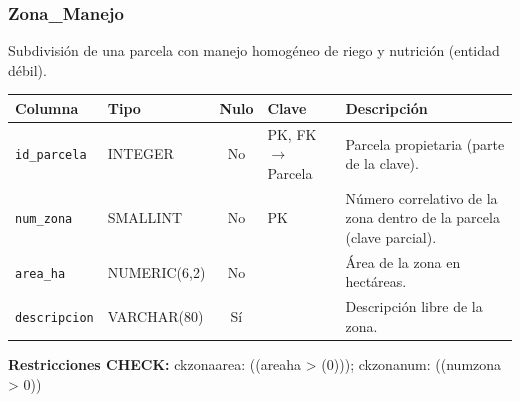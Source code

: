 \documentclass[11pt,letterpaper]{article}
\newcommand{\tbus}{\textunderscore\allowbreak}
\newcommand{\tb}[1]{{\ttfamily\let\_\tbus #1}}
\begin{document}
\subsubsection*{Zona\_Manejo}
Subdivisión de una parcela con manejo homogéneo de riego y nutrición (entidad débil).
{\footnotesize
\begin{longtable}{>{\raggedright\arraybackslash}p{3.3cm}>{\raggedright\arraybackslash}p{2.5cm}c>{\raggedright\arraybackslash}p{2.2cm}>{\raggedright\arraybackslash}p{6.1cm}}
\toprule
\textbf{Columna} & \textbf{Tipo} & \textbf{Nulo} & \textbf{Clave} & \textbf{Descripción} \\
\midrule
\endhead
\texttt{id\_parcela} & INTEGER & No & PK, FK $\to$ Parcela & Parcela propietaria (parte de la clave). \\
\texttt{num\_zona} & SMALLINT & No & PK & Número correlativo de la zona dentro de la parcela (clave parcial). \\
\texttt{area\_ha} & NUMERIC(6,2) & No &  & Área de la zona en hectáreas. \\
\texttt{descripcion} & VARCHAR(80) & Sí &  & Descripción libre de la zona. \\
\bottomrule
\end{longtable}}
{\footnotesize\raggedright\textbf{Restricciones CHECK:} \tb{ck\_zona\_area}: \tb{((area\_ha > (0)))}; \tb{ck\_zona\_num}: \tb{((num\_zona > 0))}\par}
\medskip
\end{document}
